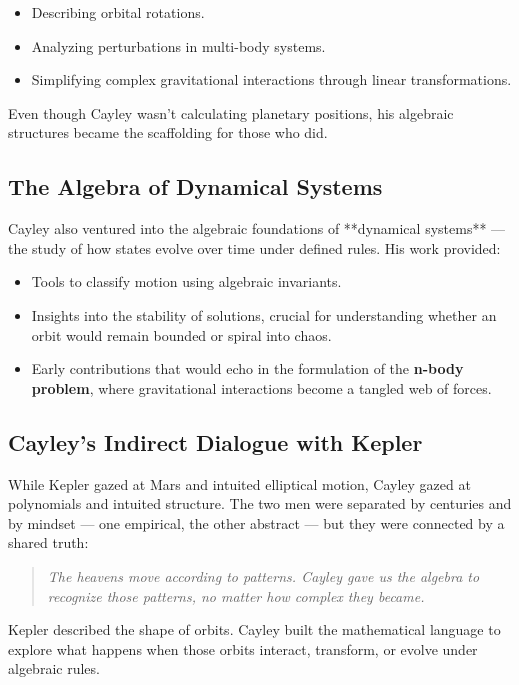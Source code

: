 \begin{itemize}
  \item Describing orbital rotations.
  \item Analyzing perturbations in multi-body systems.
  \item Simplifying complex gravitational interactions through linear transformations.
\end{itemize}

Even though Cayley wasn’t calculating planetary positions, his algebraic structures became the scaffolding for those who did.

\subsection{The Algebra of Dynamical Systems}

Cayley also ventured into the algebraic foundations of **dynamical systems** — the study of how states evolve over time under defined rules. His work provided:

\begin{itemize}
  \item Tools to classify motion using algebraic invariants.
  \item Insights into the stability of solutions, crucial for understanding whether an orbit would remain bounded or spiral into chaos.
  \item Early contributions that would echo in the formulation of the \textbf{n-body problem}, where gravitational interactions become a tangled web of forces.
\end{itemize}

\subsection{Cayley’s Indirect Dialogue with Kepler}

While Kepler gazed at Mars and intuited elliptical motion, Cayley gazed at polynomials and intuited structure. The two men were separated by centuries and by mindset — one empirical, the other abstract — but they were connected by a shared truth:

\begin{quote}
\textit{The heavens move according to patterns.  
Cayley gave us the algebra to recognize those patterns, no matter how complex they became.}
\end{quote}

Kepler described the shape of orbits.  
Cayley built the mathematical language to explore what happens when those orbits interact, transform, or evolve under algebraic rules.

